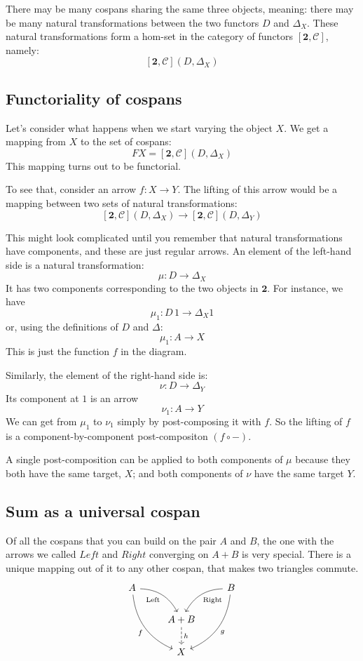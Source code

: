 \documentclass[DaoFP]{subfiles}
\begin{document}
There may be many cospans sharing the same three objects, meaning: there may be many natural transformations between the two functors $D$ and  $\Delta_X$. These natural transformations form a hom-set in the category of functors $[\mathbf{2}, \mathcal{C}]$, namely:
\[ [\mathbf{2}, \mathcal{C}](D, \Delta_X) \]

\subsection{Functoriality of cospans}

Let's consider what happens when we start varying the object $X$. We get a mapping from $X$ to the set of cospans:
\[ F X = [\mathbf{2}, \mathcal{C}](D, \Delta_X) \]
This mapping turns out to be functorial.

To see that, consider an arrow $f \colon X \to Y$. The lifting of this arrow would be a mapping between two sets of natural transformations:
\[ [\mathbf{2}, \mathcal{C}](D, \Delta_X) \to [\mathbf{2}, \mathcal{C}](D, \Delta_{Y}) \] 
 
This might look complicated until you remember that natural transformations have components, and these are just regular arrows. An element of the left-hand side is a natural transformation:
\[ \mu \colon D \to \Delta_X \]
It has two components corresponding to the two objects in $\mathbf{2}$. For instance, we have
\[ \mu_1 \colon D \, 1 \to \Delta_X 1 \]
or, using the definitions of $D$ and $\Delta$:
\[ \mu_1 \colon A \to X \]
This is just the function $f$ in the diagram. 

Similarly, the element of the right-hand side is:
\[ \nu \colon D \to \Delta_{Y} \]
Its component at $1$ is an arrow
\[ \nu_1 \colon A \to Y \]
We can get from $\mu_1$ to $\nu_1$ simply by post-composing it with $f$. So the lifting of $f$ is a component-by-component post-compositon $(f \circ -)$. 

A single post-composition can be applied to both components of $\mu$ because they both have the same target, $X$; and both components of $\nu$ have the same target $Y$.

\subsection{Sum as a universal cospan}

Of all the cospans that you can build on the pair $A$ and $B$, the one with the arrows we called $Left$ and $Right$ converging on $A + B$  is very special. There is a unique mapping out of it to any other cospan, that makes two triangles commute.  
\[
 \begin{tikzcd}
 A
 \arrow[dr,  bend left, "\text{Left}"']
 \arrow[ddr, bend right, "f"']
 && B
 \arrow[dl, bend right, "\text{Right}"]
 \arrow[ddl, bend left, "g"]
 \\
&A + B
\arrow[d, dashed, "h"]
\\
& X
 \end{tikzcd}
\]
\end{document}
